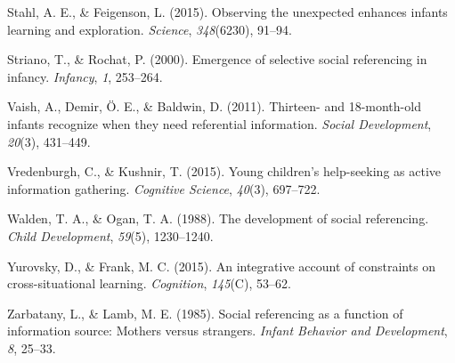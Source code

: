 \documentclass[a4paper,man,apacite,floatsintext]{apa6}
\begin{document}
\hypertarget{ref-Stahl2015}{}
Stahl, A. E., \& Feigenson, L. (2015). Observing the unexpected enhances
infants learning and exploration. \emph{Science}, \emph{348}(6230),
91--94.

\hypertarget{ref-Striano2000}{}
Striano, T., \& Rochat, P. (2000). Emergence of selective social
referencing in infancy. \emph{Infancy}, \emph{1}, 253--264.

\hypertarget{ref-Vaish2011}{}
Vaish, A., Demir, Ö. E., \& Baldwin, D. (2011). Thirteen- and
18-month-old infants recognize when they need referential information.
\emph{Social Development}, \emph{20}(3), 431--449.

\hypertarget{ref-Vredenburgh2015}{}
Vredenburgh, C., \& Kushnir, T. (2015). Young children's help-seeking as
active information gathering. \emph{Cognitive Science}, \emph{40}(3),
697--722.

\hypertarget{ref-Walden1988}{}
Walden, T. A., \& Ogan, T. A. (1988). The development of social
referencing. \emph{Child Development}, \emph{59}(5), 1230--1240.

\hypertarget{ref-Yurovsky2015}{}
Yurovsky, D., \& Frank, M. C. (2015). An integrative account of
constraints on cross-situational learning. \emph{Cognition},
\emph{145}(C), 53--62.

\hypertarget{ref-Zarbatany1985}{}
Zarbatany, L., \& Lamb, M. E. (1985). Social referencing as a function
of information source: Mothers versus strangers. \emph{Infant Behavior
and Development}, \emph{8}, 25--33.


\end{document}
